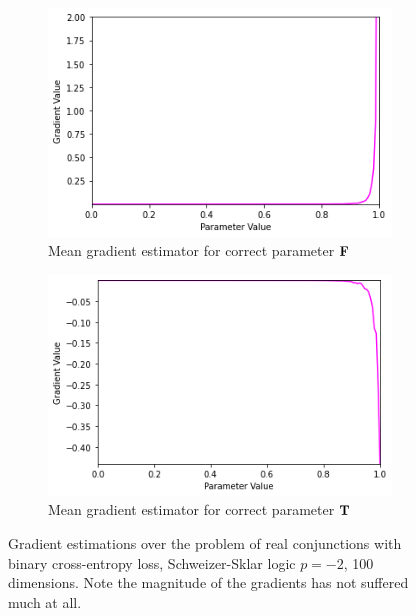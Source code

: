 \begin{figure}[ht]
\begin{subfigure}[b]{0.47\textwidth}
        \includegraphics[width=\textwidth]{imgs/grad_ss_bce_falseparam_100dim_avg.png}
        \caption{Mean gradient estimator for correct parameter $\textbf{F}$}
        \label{fig:conjgrad100falseavgssbce}
    \end{subfigure}
    \begin{subfigure}[b]{0.47\textwidth}
        \centering
        \includegraphics[width=\textwidth]{imgs/grad_ss_bce_trueparam_100dim_avg.png}
        \caption{Mean gradient estimator for correct parameter $\textbf{T}$}
        \label{fig:conjgrad100trueavgssbce}
    \end{subfigure}
       \caption{Gradient estimations over the problem of real conjunctions with binary cross-entropy loss, Schweizer-Sklar logic $p=-2$, 100 dimensions. Note the magnitude of the gradients has not suffered much at all.}
       \label{fig:conjgrad100ssbce}
\end{figure}

